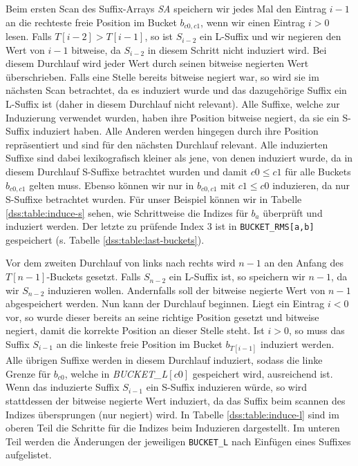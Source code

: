 Beim ersten Scan des Suffix-Arrays \textit{SA} speichern wir jedes Mal den Eintrag $i-1$ an die rechteste freie Position im Bucket $b_{c0,c1}$, wenn wir einen Eintrag $i > 0$ lesen. Falls $T[i-2] > T[i-1]$, so ist $S_{i-2}$ ein L-Suffix und wir negieren den Wert von $i-1$ bitweise, da $S_{i-2}$ in diesem Schritt nicht induziert wird. Bei diesem Durchlauf wird jeder Wert durch seinen bitweise negierten Wert überschrieben. Falls eine Stelle bereits bitweise negiert war, so wird sie im nächsten Scan betrachtet, da es induziert wurde und das dazugehörige Suffix ein L-Suffix ist (daher in diesem Durchlauf nicht relevant). Alle Suffixe, welche zur Induzierung verwendet wurden, haben ihre Position bitweise negiert, da sie ein S-Suffix induziert haben. Alle Anderen werden hingegen durch ihre Position repräsentiert und sind für den nächsten Durchlauf relevant. Alle induzierten Suffixe sind dabei lexikografisch kleiner als jene, von denen induziert wurde, da in diesem Durchlauf S-Suffixe betrachtet wurden und damit $c0 \leq c1$ für alle Buckets $b_{c0,c1}$ gelten muss. Ebenso können wir nur in $b_{c0,c1}$ mit $c1 \leq c0$ induzieren, da nur S-Suffixe betrachtet wurden. Für unser Beispiel können wir in Tabelle \ref{dss:table:induce-s} sehen, wie Schrittweise die Indizes für $b_{a}$ überprüft und induziert werden. Der letzte zu prüfende Index 3 ist in \texttt{BUCK\-ET\_RMS[a,b]} gespeichert (s. Tabelle \ref{dss:table:last-buckets}).

Vor dem zweiten Durchlauf von links nach rechts wird $n-1$ an den Anfang des $T[n-1]$-Buckets gesetzt. Falls $S_{n-2}$ ein L-Suffix ist, so speichern wir $n-1$, da wir $S_{n-2}$ induzieren wollen. Andernfalls soll der bitweise negierte Wert von $n-1$ abgespeichert werden. Nun kann der Durchlauf beginnen.
Liegt ein Eintrag $i < 0$ vor, so wurde dieser bereits an seine richtige Position gesetzt und bitweise negiert, damit die korrekte Position an dieser Stelle steht. Ist $i > 0$, so muss das Suffix $S_{i-1}$ an die linkeste freie Position im Bucket $b_{T[i-1]}$ induziert werden. Alle übrigen Suffixe werden in diesem Durchlauf induziert, sodass die linke Grenze für $b_{c0}$, welche in \textit{BUCK\-ET\_L$[c0]$} gespeichert wird, ausreichend ist. Wenn das induzierte Suffix $S_{i-1}$ ein S-Suffix induzieren würde, so wird stattdessen der bitweise negierte Wert induziert, da das Suffix beim scannen des Indizes übersprungen (nur negiert) wird. In Tabelle \ref{dss:table:induce-l} sind im oberen Teil die Schritte für die Indizes beim Induzieren dargestellt. Im unteren Teil werden die Änderungen der jeweiligen \texttt{BUCK\-ET\_L} nach Einfügen eines Suffixes aufgelistet.
